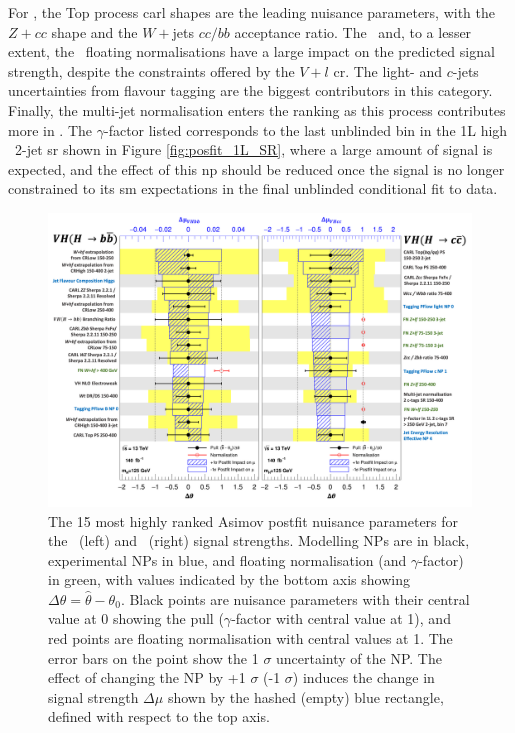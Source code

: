 For \vhc, the Top process \gls{carl} shapes are the leading nuisance parameters, with the $Z+cc$ shape and the $W+$jets $cc/bb$ acceptance ratio. The \zlf\ and, to a lesser extent, the \wlf\ floating normalisations have a large impact on the predicted signal strength, despite the constraints offered by the $V+l$ \gls{cr}. The light- and $c$-jets uncertainties from flavour tagging are the biggest contributors in this category. Finally, the multi-jet normalisation enters the ranking as this process contributes more in \vhc. The $\gamma$-factor listed corresponds to the last unblinded bin in the 1L high \ptv\ 2-jet \gls{sr} shown in Figure \ref{fig:posfit_1L_SR}, where a large amount of signal is expected, and the effect of this \gls{np} should be reduced once the signal is no longer constrained to its \gls{sm} expectations in the final unblinded conditional fit to data.

\begin{figure}[h!]
    \centering
    \includegraphics[width=\textwidth]{Images/VH/Fit/fromSlides/ranking.png}
    \caption{The 15 most highly ranked Asimov postfit nuisance parameters for the \vhb\ (left) and \vhc\ (right) signal strengths. Modelling NPs are in black, experimental NPs in blue, and floating normalisation (and $\gamma$-factor) in green, with values indicated by the bottom axis showing $\Delta \theta = \hat{\theta} - \theta_0$. Black points are nuisance parameters with their central value at 0 showing the pull ($\gamma$-factor with central value at 1), and red points are floating normalisation with central values at 1. The error bars on the point show the 1 $\sigma$ uncertainty of the NP. The effect of changing the NP by +1 $\sigma$ (-1 $\sigma$) induces the change in signal strength $\Delta\mu$ shown by the hashed (empty) blue rectangle, defined with respect to the top axis.}
    \label{fig:rankingPostfit}
\end{figure} 

